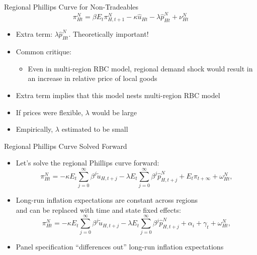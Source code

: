 \documentclass[10pt]{beamer}
\begin{document}
\begin{frame}{Regional Phillips Curve for Non-Tradeables}
	\[\pi^N_{Ht}=\beta E_{t}\pi^N_{H,t+1}-\kappa\hat{u}_{Ht} - \lambda \hat{p}^N_{Ht} + \nu^N_{Ht} \]
	\vspace{-10pt}
	\begin{itemize}
		\itemsep1em 
		\item Extra term: $\lambda \hat{p}^N_{Ht}$. Theoretically important!
		\item Common critique:
		\begin{itemize}
			\item Even in multi-region RBC model, regional demand shock would result in an increase in relative price of local goods
		\end{itemize}
		\item Extra term implies that this model nests multi-region RBC model
		\item If prices were flexible, $\lambda$ would be large
		\item Empirically, $\lambda$ estimated to be small
	\end{itemize}
\end{frame}


\begin{frame}{Regional Phillips Curve Solved Forward}
	\begin{itemize}
		\itemsep1.5em 
		\item Let's solve the regional Phillips curve forward:
		\[\pi_{Ht}^N = - \kappa E_{t} \sum_{j=0}^{\infty} \beta^j  \tilde{u}_{H,t+j} - \lambda E_{t} \sum_{j=0}^{\infty} \beta^j \hat{p}_{H,t+j}^N + E_{t}\pi_{t+\infty} + \omega_{Ht}^N, \]
		\item Long-run inflation expectations are constant across regions \\ and can be replaced with time and state fixed effects:
		\[\pi_{Ht}^N = - \kappa E_{t} \sum_{j=0}^{\infty} \beta^j  \tilde{u}_{H,t+j} - \lambda E_{t} \sum_{j=0}^{\infty} \beta^j \hat{p}_{H,t+j}^N + \alpha_i + \gamma_t + \omega_{Ht}^N, \]
		\item Panel specification ``differences out'' long-run inflation expectations
	\end{itemize}
\end{frame}
\end{document}
